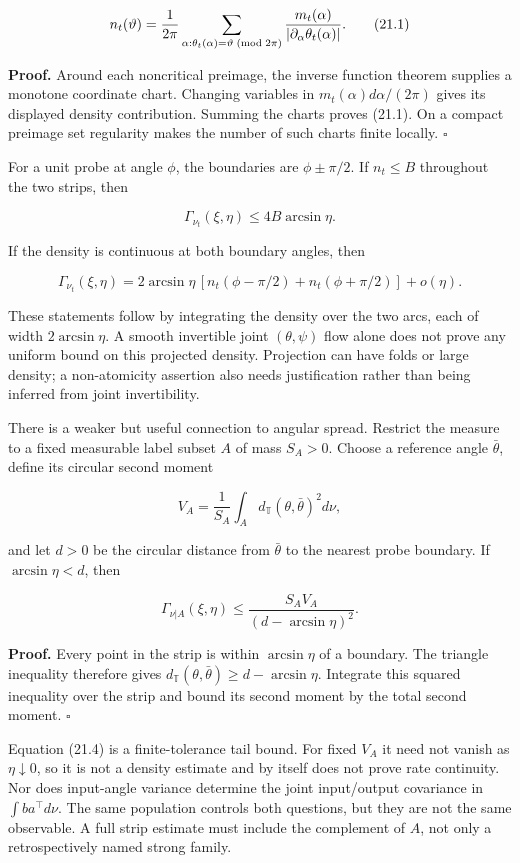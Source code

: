 \documentclass[
  10pt,
]{article}
\begin{document}
\[
 n_t(\vartheta)=\frac1{2\pi}
 \sum_{\alpha:\theta_t(\alpha)=\vartheta\;({\rm mod}\;2\pi)}
 \frac{m_t(\alpha)}{|\partial_\alpha\theta_t(\alpha)|}.
 \tag{21.1}
\]

\textbf{Proof.} Around each noncritical preimage, the inverse function
theorem supplies a monotone coordinate chart. Changing variables in
\(m_t(\alpha)d\alpha/(2\pi)\) gives its displayed density contribution.
Summing the charts proves (21.1). On a compact preimage set regularity
makes the number of such charts finite locally. \(\square\)

For a unit probe at angle \(\phi\), the boundaries are \(\phi\pm\pi/2\).
If \(n_t\le B\) throughout the two strips, then

\[
 \Gamma_{\nu_t}(\xi,\eta)\le4B\arcsin\eta.
 \tag{21.2}
\]

If the density is continuous at both boundary angles, then

\[
 \Gamma_{\nu_t}(\xi,\eta)
 =2\arcsin\eta\,[n_t(\phi-\pi/2)+n_t(\phi+\pi/2)]+o(\eta).
 \tag{21.3}
\]

These statements follow by integrating the density over the two arcs,
each of width \(2\arcsin\eta\). A smooth invertible joint
\((\theta,\psi)\) flow alone does not prove any uniform bound on this
projected density. Projection can have folds or large density; a
non-atomicity assertion also needs justification rather than being
inferred from joint invertibility.

There is a weaker but useful connection to angular spread. Restrict the
measure to a fixed measurable label subset \(A\) of mass \(S_A>0\).
Choose a reference angle \(\bar\theta\), define its circular second
moment

\[
 V_A=\frac1{S_A}\int_A d_{\mathbb T}(\theta,\bar\theta)^2d\nu,
\]

and let \(d>0\) be the circular distance from \(\bar\theta\) to the
nearest probe boundary. If \(\arcsin\eta<d\), then

\[
 \boxed{\Gamma_{\nu|A}(\xi,\eta)
 \le\frac{S_AV_A}{(d-\arcsin\eta)^2}.}
 \tag{21.4}
\]

\textbf{Proof.} Every point in the strip is within \(\arcsin\eta\) of a
boundary. The triangle inequality therefore gives
\(d_{\mathbb T}(\theta,\bar\theta)\ge d-\arcsin\eta\). Integrate this
squared inequality over the strip and bound its second moment by the
total second moment. \(\square\)

Equation (21.4) is a finite-tolerance tail bound. For fixed \(V_A\) it
need not vanish as \(\eta\downarrow0\), so it is not a density estimate
and by itself does not prove rate continuity. Nor does input-angle
variance determine the joint input/output covariance in
\(\int ba^\top d\nu\). The same population controls both questions, but
they are not the same observable. A full strip estimate must include the
complement of \(A\), not only a retrospectively named strong family.
\end{document}
